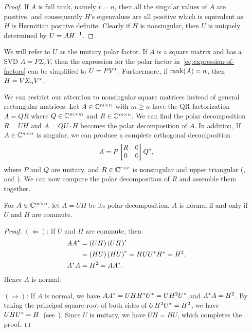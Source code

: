 \documentclass[12pt]{article}
\begin{document}
\begin{proof}
    If $A$ is full rank, namely $r = n$, then all the singular values of $A$ are positive, and consequently $H$'s eigenvalues are all positive which is equivalent as $H$ is Hermitian positive definite. Clearly if $H$ is nonsingular, then $U$ is uniquely determined by $U = AH^{-1}$.
\end{proof}
We will refer to $U$ as the unitary polar factor. If $A$ is a square matrix and 
has a SVD $A = P\Sigma_r V$, then the expression for the polar factor 
in~\eqref{eq:expression-of-factors} can be simplified to $U = PV^*$. 
Furthermore, if $\mathrm{rank}(A) = n$, then $H = V\varSigma_n V^*$.

We can restrict our attention to nonsingular square matrices instead of general rectangular matrices. Let $A\in\mathbb{C}^{m\times n}$ with $m\geq n$ have the QR factorization $A = QR$ where $Q\in\mathbb{C}^{m\times m}$ and $R\in \mathbb{C}^{m\times n}$. We can find the polar decomposition $R = UH$ and $A = QU \cdot H$ becomes the polar decomposition of $A$. In addition, If $A\in\mathbb{C}^{n\times n}$ is singular, we can produce a complete orthogonal decomposition
\begin{equation}
    A = P
    \begin{bmatrix}
        R & 0 \\ 0 & 0
    \end{bmatrix}
    Q^*,
\end{equation}
where $P$ and $Q$ are unitary, and $R\in\mathbb{C}^{r\times r}$ is nonsingular and upper triangular (,  and ). We can now compute the polar decomposition of $R$ and assemble them together.


\begin{theorem}
    For $A\in\mathbb{C}^{m\times n}$, let $A = UH$ be its polar decomposition. $A$ is normal if and only if $U$ and $H$ are commute.
\end{theorem}

\begin{proof}
    $(\Leftarrow)$: If $U$ and $H$ are commute, then 
    \begin{equation}
        \notag
        \begin{aligned}
            AA^* &= \left(UH\right)\left(UH\right)^*\\
                & = \left(HU\right)\left(HU\right)^* = HUU^* H^* = H^2. \\
            A^* A & = H^2 = AA^*.
        \end{aligned}
    \end{equation}
    Hence $A$ is normal.

    $(\Rightarrow)$: If $A$ is normal, we have $AA^* = UHH^* U^*=UH^2U^*$ and $A^* A = H^2$. By taking the principal square root of both sides of $UH^2 U^* = H^2$, we have $UHU^* = H$~(see~). Since $U$ is unitary, we have $UH = HU$, which completes the proof.
\end{proof}
\end{document}
